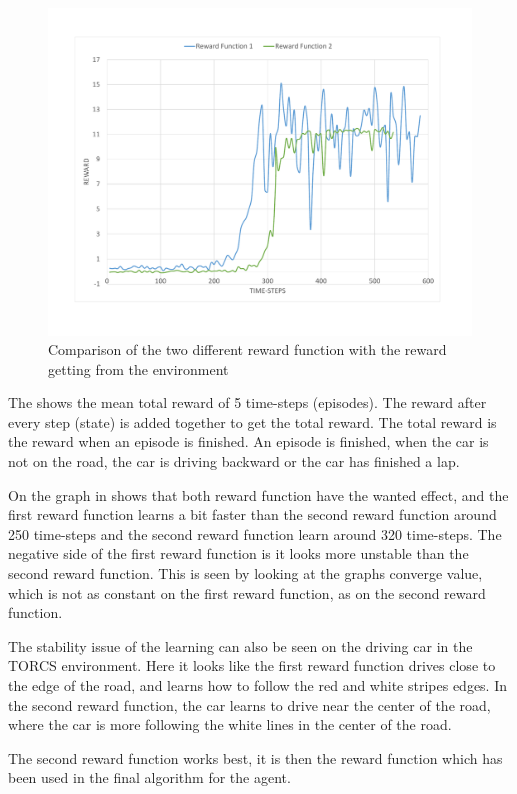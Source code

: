 \begin{figure}[H]
	\centering
	\includegraphics[width=1\textwidth]{Figures/Result/change_of_Reward_reward_graph.pdf}
	\caption{Comparison of the two different reward function with the reward getting from the environment}
	\label{fig:change_of_Reward_reward_graph}
\end{figure}

The  shows the mean total reward of 5 time-steps (episodes). The reward after every step (state) is added together to get the total reward. The total reward is the reward when an episode is finished. An episode is finished, when the car is not on the road, the car is driving backward or the car has finished a lap.   

On the graph in  shows that both reward function have the wanted effect, and the first reward function learns a bit faster than the second reward function around 250 time-steps and the second reward function learn around 320 time-steps. The negative side of the first reward function is it looks more unstable than the second reward function. This is seen by looking at the graphs converge value, which is not as constant on the first reward function, as on the second reward function. 

The stability issue of the learning can also be seen on the driving car in the TORCS environment. Here it looks like the first reward function drives close to the edge of the road, and learns how to follow the red and white stripes edges. In the second reward function, the car learns to drive near the center of the road, where the car is more following the white lines in the center of the road. 

The second reward function works best, it is then the reward function which has been used in the final algorithm for the agent.
 
